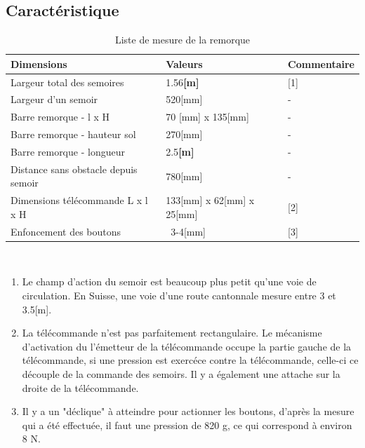 \subsection{Caractéristique}
\begin{table}[H]
    \begin{center}
        \caption{Liste de mesure de la remorque}
        \begin{tabular}{|l|l|l|}
            Dimensions                           & Valeurs                   & Commentaire \\ \hline
            Largeur total des semoires           & 1.56\textbf{[m]}          & [1]         \\
            Largeur d'un semoir                  & 520[mm]                   & -           \\
            Barre remorque - l x H               & 70 [mm] x 135[mm]         & -           \\
            Barre remorque - hauteur sol         & 270[mm]                   & -           \\
            Barre remorque - longueur            & 2.5\textbf{[m]}           & -           \\
            Distance sans obstacle depuis semoir & 780[mm]                   & -           \\
            Dimensions télécommande L x l x H    & 133[mm] x 62[mm] x 25[mm] & [2]         \\
            Enfoncement des boutons              & ~3-4[mm]                  & [3]         \\
        \end{tabular}
    \end{center}
\end{table}\\
\begin{enumerate}
    \item{Le champ d'action du semoir est beaucoup plus petit qu'une voie de circulation. En Suisse, une voie d'une route cantonnale mesure entre 3 et 3.5[m].}
    \item{La télécommande n'est pas parfaitement rectangulaire. Le mécanisme d'activation du l'émetteur de la télécommande occupe la partie gauche de la télécommande,
                si une pression est exercéce contre la télécommande, celle-ci ce découple de la commande des semoirs. Il y a également une attache sur la droite de la télécommande.}
    \item{Il y a un "déclique" à atteindre pour actionner les boutons, d'après la mesure qui a été effectuée, il faut une pression de 820 \si{\gram}, ce qui correspond à environ 8 \si{\newton}}.
\end{enumerate}

